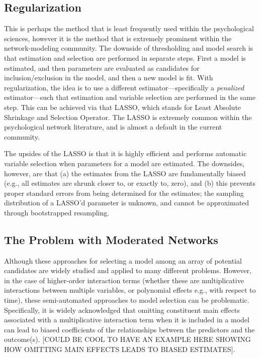 \subsection{Regularization}
This is perhaps the method that is least frequently used within the psychological sciences, however it is the method that is extremely prominent within the network-modeling community. The downside of thresholding and model search is that estimation and selection are performed in separate steps. First a model is estimated, and then parameters are evaluated as candidates for inclusion/exclusion in the model, and then a new model is fit. With regularization, the idea is to use a different estimator---specifically a \textit{penalized} estimator---such that estimation and variable selection are performed in the same step. This can be achieved via that LASSO, which stands for Least Absolute Shrinkage and Selection Operator. The LASSO is extremely common within the psychological network literature, and is almost a default in the current community.

The upsides of the LASSO is that it is highly efficient and performs automatic variable selection when parameters for a model are estimated. The downsides, however, are that (a) the estimates from the LASSO are fundamentally biased (e.g., all estimates are shrunk closer to, or exactly to, zero), and (b) this prevents proper standard errors from being determined for the estimates; the sampling distribution of a LASSO'd parameter is unknown, and cannot be approximated through bootstrapped resampling. 

\subsection{The Problem with Moderated Networks}
Although these approaches for selecting a model among an array of potential candidates are widely studied and applied to many different problems. However, in the case of higher-order interaction terms (whether these are multiplicative interactions between multiple variables, or polynomial effects e.g., with respect to time), these semi-automated approaches to model selection can be problematic. Specifically, it is widely acknowledged that omitting constituent main effects associated with a multiplicative interaction term when it is included in a model can lead to biased coefficients of the relationships between the predictors and the outcome(s). [COULD BE COOL TO HAVE AN EXAMPLE HERE SHOWING HOW OMITTING MAIN EFFECTS LEADS TO BIASED ESTIMATES].

